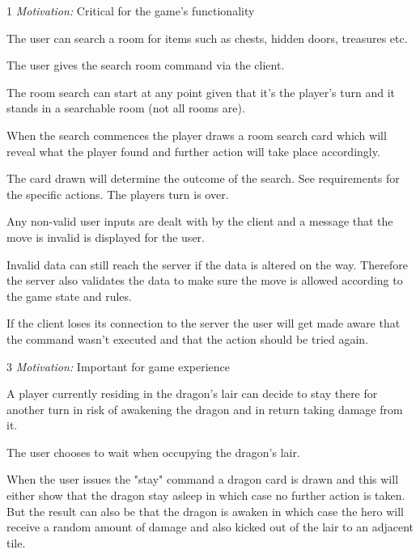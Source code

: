 1 \emph{Motivation:} Critical for the game's functionality

\stoprequirement


The user can search a room for items such as chests, hidden doors, treasures etc.
 
The user gives the search room command via the client.
 
The room search can start at any point given that it's the player's turn and it stands in a searchable room (not all rooms are).

When the search commences the player draws a room search card which will reveal what the player found and further action will take place accordingly.
 
The card drawn will determine the outcome of the search. See requirements for the specific actions.
The players turn is over.
 
Any non-valid user inputs are dealt with by the client and a message that the move is invalid is displayed for the user.
 
Invalid data can still reach the server if the data is altered on the way. Therefore the server also validates the data to make sure the move is allowed according to the game state and rules.
 
If the client loses its connection to the server the user will get made aware that the command wasn't executed and that the action should be tried again.

3 \emph{Motivation:} Important for game experience

\stoprequirement


 A player currently residing in the dragon's lair can decide to stay there for another turn in risk of awakening the dragon and in return taking damage from it. 

 The user chooses to wait when occupying the dragon's lair.

 When the user issues the "stay" command a dragon card is drawn and this will either show that the dragon stay asleep in which case no further action is taken. But the result can also be that the dragon is awaken in which case the hero will receive a random amount of damage and also kicked out of the lair to an adjacent tile.

